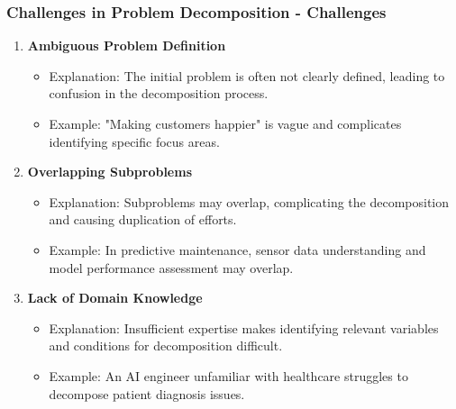 \documentclass[aspectratio=169]{beamer}
\begin{document}
\begin{frame}[fragile]
    \frametitle{Challenges in Problem Decomposition - Challenges}
    \begin{enumerate}
        \item \textbf{Ambiguous Problem Definition}
            \begin{itemize}
                \item Explanation: The initial problem is often not clearly defined, leading to confusion in the decomposition process. 
                \item Example: "Making customers happier" is vague and complicates identifying specific focus areas.
            \end{itemize}
        
        \item \textbf{Overlapping Subproblems}
            \begin{itemize}
                \item Explanation: Subproblems may overlap, complicating the decomposition and causing duplication of efforts. 
                \item Example: In predictive maintenance, sensor data understanding and model performance assessment may overlap.
            \end{itemize}
        
        \item \textbf{Lack of Domain Knowledge}
            \begin{itemize}
                \item Explanation: Insufficient expertise makes identifying relevant variables and conditions for decomposition difficult. 
                \item Example: An AI engineer unfamiliar with healthcare struggles to decompose patient diagnosis issues.
            \end{itemize}        
    \end{enumerate}
\end{frame}
\end{document}
